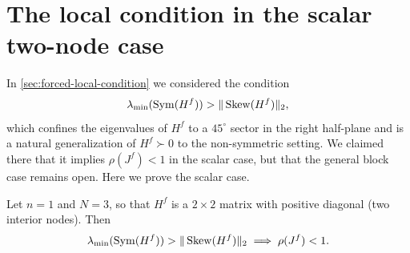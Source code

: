 \chapter{The local condition in the scalar two-node case}\label{apx:conjecture-scalar}

In \cref{sec:forced-local-condition} we considered the condition
\[
	\lambda_{\min}(\operatorname{Sym}(H^f)) > \|\operatorname{Skew}(H^f)\|_2,
\]
which confines the eigenvalues of $H^f$ to a $45^\circ$ sector in the right half-plane and is a natural generalization of $H^f \succ 0$ to the non-symmetric setting. We claimed there that it implies $\rho(J^f) < 1$ in the scalar case, but that the general block case remains open. Here we prove the scalar case.

\begin{lemma}
	Let $n = 1$ and $N = 3$, so that $H^f$ is a $2 \times 2$ matrix with positive diagonal (two interior nodes). Then
	\[
		\lambda_{\min}(\operatorname{Sym}(H^f)) > \|\operatorname{Skew}(H^f)\|_2 \implies \rho(J^f) < 1.
	\]
\end{lemma}
